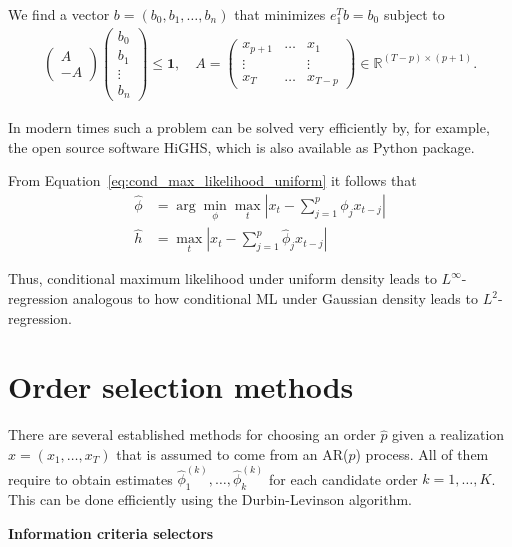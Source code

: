 We find a vector $b=(b_0,b_1,\dots,b_n)$ that minimizes $e_1^Tb=b_0$ subject to
\begin{align*}
    \begin{pmatrix}
        A\\
        -A
    \end{pmatrix}\begin{pmatrix}
        b_0\\
        b_1\\
        \vdots\\
        b_n
    \end{pmatrix}\le\mathbf{1},\quad A=\begin{pmatrix}
        x_{p+1} & \dots & x_1\\
        \vdots & & \vdots\\
        x_T & \dots & x_{T-p}
    \end{pmatrix}\in\mathbb{R}^{(T-p)\times(p+1)}.
\end{align*}

In modern times such a problem can be solved very efficiently by, for example, the open source software HiGHS, which is also available as Python package.

From Equation~\eqref{eq:cond_max_likelihood_uniform} it follows that
\begin{align*}
    \hat{\phi}&=\arg\min_{\phi}\max_t\left|x_t-\sum_{j=1}^{p}\phi_jx_{t-j}\right|\\
    \hat{h}&=\max_t\left|x_t-\sum_{j=1}^{p}\hat{\phi}_jx_{t-j}\right|
\end{align*}

Thus, conditional maximum likelihood under uniform density leads to $L^{\infty}$-regression analogous to how conditional ML under Gaussian density leads to $L^2$-regression.

\section{Order selection methods}\label{sec:classical_order_selection_methods}

There are several established methods for choosing an order $\hat{p}$ given a realization $x=(x_1,\dots,x_T)$ that is assumed to come from an AR($p$) process. All of them require to obtain estimates $\hat{\phi}_1^{(k)},\dots,\hat{\phi}_k^{(k)}$ for each candidate order $k=1,\dots,K$. This can be done efficiently using the Durbin-Levinson algorithm.

\textbf{Information criteria selectors}

